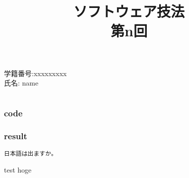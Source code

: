\documentclass{article}
\title{\rm ソフトウェア技法 \\ 第n回}
\date{}
\begin{document}
\maketitle

\begin{description}
	\item[\rm \large 学籍番号:xxxxxxxxx]
	\item[\rm \large 氏名: name]
\end{description}

\section{}
\subsection{}
\subsubsection*{code}


\subsubsection*{result}
\begin{lstlisting}
日本語は出ますか。
\end{lstlisting}

\begin{result}{test}
hoge
\end{result}
\end{document}
